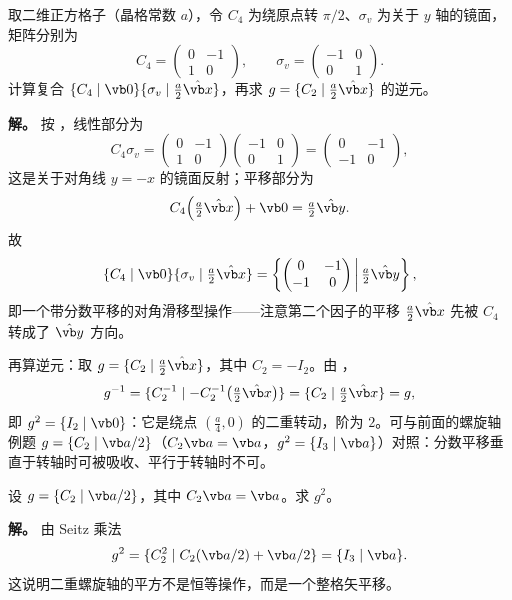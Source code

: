 \begin{example}[{二维仿射等距变换的复合与求逆}]
取二维正方格子（晶格常数 $a$），令 $C_4$ 为绕原点转 $\pi/2$、$\sigma_v$ 为关于 $y$ 轴的镜面，矩阵分别为
\[
C_4=\begin{pmatrix}0&-1\\1&0\end{pmatrix},
\qquad
\sigma_v=\begin{pmatrix}-1&0\\0&1\end{pmatrix}.
\]
计算复合 $\{C_4\mid\vb 0\}\{\sigma_v\mid\tfrac a2\hat{\vb x}\}$，再求 $g=\{C_2\mid\tfrac a2\hat{\vb x}\}$ 的逆元。

\textbf{解。} 按 ，线性部分为
\[
C_4\sigma_v
=\begin{pmatrix}0&-1\\1&0\end{pmatrix}
 \begin{pmatrix}-1&0\\0&1\end{pmatrix}
=\begin{pmatrix}0&-1\\-1&0\end{pmatrix},
\]
这是关于对角线 $y=-x$ 的镜面反射；平移部分为
\[
C_4\Bigl(\tfrac a2\hat{\vb x}\Bigr)+\vb 0=\tfrac a2\hat{\vb y}.
\]
故
\[
\{C_4\mid\vb 0\}\{\sigma_v\mid\tfrac a2\hat{\vb x}\}
=\left\{\begin{pmatrix}0&-1\\-1&0\end{pmatrix}\,\middle|\,\tfrac a2\hat{\vb y}\right\},
\]
即一个带分数平移的对角滑移型操作——注意第二个因子的平移 $\tfrac a2\hat{\vb x}$ 先被 $C_4$ 转成了 $\hat{\vb y}$ 方向。

再算逆元：取 $g=\{C_2\mid\tfrac a2\hat{\vb x}\}$，其中 $C_2=-I_2$。由 ，
\[
g^{-1}=\{C_2^{-1}\mid-C_2^{-1}\bigl(\tfrac a2\hat{\vb x}\bigr)\}
=\{C_2\mid\tfrac a2\hat{\vb x}\}=g,
\]
即 $g^2=\{I_2\mid\vb 0\}$：它是绕点 $(\tfrac a4,0)$ 的二重转动，阶为 $2$。可与前面的螺旋轴例题 $g=\{C_2\mid\vb a/2\}$（$C_2\vb a=\vb a$，$g^2=\{I_3\mid\vb a\}$）对照：分数平移垂直于转轴时可被吸收、平行于转轴时不可。
\end{example}

\begin{workedexample}
设 $g=\{C_2\mid\vb a/2\}$，其中 $C_2\vb a=\vb a$。求 $g^2$。

\textbf{解。} 由 Seitz 乘法
\[
g^2=\{C_2^2\mid C_2(\vb a/2)+\vb a/2\}
=\{I_3\mid\vb a\}.
\]
这说明二重螺旋轴的平方不是恒等操作，而是一个整格矢平移。
\end{workedexample}


